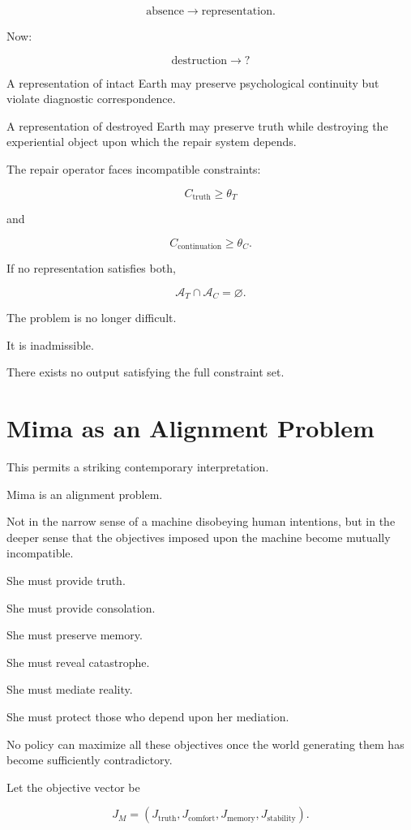 \documentclass[11pt,oneside]{book}
\theoremstyle{definition}
\theoremstyle{remark}
\newcommand{\A}{\mathcal{A}}
\begin{document}
\[
\text{absence}
\rightarrow
\text{representation}.
\]

Now:

\[
\text{destruction}
\rightarrow
?
\]

A representation of intact Earth may preserve psychological continuity but violate diagnostic correspondence.

A representation of destroyed Earth may preserve truth while destroying the experiential object upon which the repair system depends.

The repair operator faces incompatible constraints:

\[
C_{\mathrm{truth}}\geq\theta_T
\]

and

\[
C_{\mathrm{continuation}}\geq\theta_C.
\]

If no representation satisfies both,

\[
\A_T\cap\A_C=\varnothing.
\]

The problem is no longer difficult.

It is inadmissible.

There exists no output satisfying the full constraint set.

\section{Mima as an Alignment Problem}

This permits a striking contemporary interpretation.

Mima is an alignment problem.

Not in the narrow sense of a machine disobeying human intentions, but in the deeper sense that the objectives imposed upon the machine become mutually incompatible.

She must provide truth.

She must provide consolation.

She must preserve memory.

She must reveal catastrophe.

She must mediate reality.

She must protect those who depend upon her mediation.

No policy can maximize all these objectives once the world generating them has become sufficiently contradictory.

Let the objective vector be

\[
J_M
=
(
J_{\mathrm{truth}},
J_{\mathrm{comfort}},
J_{\mathrm{memory}},
J_{\mathrm{stability}}
).
\]
\end{document}

